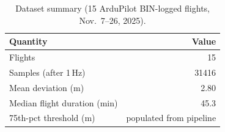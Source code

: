 \begin{table}[t]
\centering
\caption{Dataset summary (15 ArduPilot BIN-logged flights, Nov.~7--26, 2025).}
\label{tab:data}
\begin{tabular}{lr}
\toprule
Quantity & Value \\
\midrule
Flights & 15 \\
Samples (after 1\,Hz) & 31416 \\
Mean deviation (m) & 2.80 \\
Median flight duration (min) & 45.3 \\
75th-pct threshold (m) & populated from pipeline \\
\bottomrule
\end{tabular}
\end{table}
